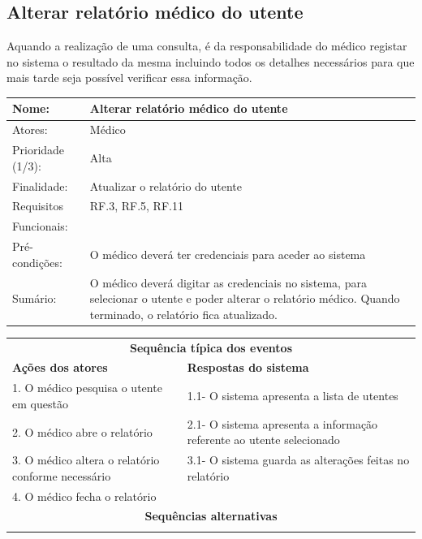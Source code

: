 \documentclass[11pt,a4paper,twoside]{report}
\begin{document}
\subsection{Alterar relatório médico do utente }

Aquando a realização de uma consulta, é da responsabilidade do médico registar no sistema o resultado da mesma incluindo todos os detalhes necessários para que mais tarde seja possível verificar essa informação. 

\begin{center}
	\begin{tabularx}{\textwidth}{|lX|}
		\hline
		\textbf{Nome}: & \textbf{Alterar relatório médico do utente} \\ \hline
		Atores: & Médico   \\ \hline
		Prioridade (1/3): & Alta \\ \hline
		Finalidade: & Atualizar o relatório do utente    \\ \hline
		Requisitos & RF.3, RF.5, RF.11     \\
		Funcionais: & \\
		Pré-condições: &  O médico deverá ter credenciais para aceder ao sistema   \\
		Sumário: & O médico deverá digitar as credenciais no sistema, para selecionar o utente e poder alterar o relatório médico. Quando terminado, o relatório fica atualizado.  \\
		\hline
	\end{tabularx}
	
	\begin{tabularx}{\textwidth}{|XX|}
		\hline
		\multicolumn{2}{|c|}{\textbf{Sequência típica dos eventos} }\\
		\textbf{Ações dos atores}  & \textbf{Respostas do sistema} \\
		1.     O médico pesquisa o utente em questão    &   1.1-  O sistema apresenta a lista de utentes \\
		2.      O médico abre o relatório      & 2.1- O sistema apresenta a informação referente ao utente selecionado   \\
		3.      O médico altera o relatório conforme necessário     & 3.1-     O sistema guarda as alterações feitas no relatório   \\
		 4. O médico fecha o relatório  & \\
		
		\hline
		\multicolumn{2}{|c|}{\textbf{Sequências alternativas } }\\
		\hline
		\multicolumn{2}{|l|}{  }\\
		\hline
	\end{tabularx}
	
\end{center}
\end{document}
